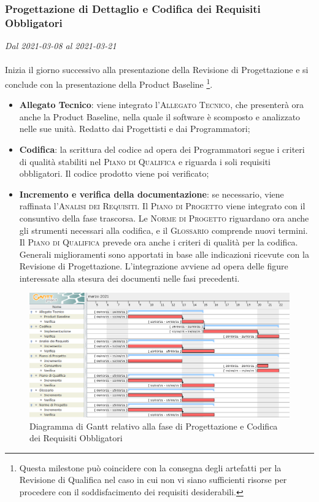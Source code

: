 \subsubsection{Progettazione di Dettaglio e Codifica dei Requisiti Obbligatori}

\textit{Dal 2021-03-08 al 2021-03-21}
\\\\
Inizia il giorno successivo alla presentazione della Revisione di Progettazione e si conclude con la presentazione della Product Baseline \footnote{Questa milestone può coincidere con la consegna degli artefatti per la Revisione di Qualifica nel caso in cui non vi siano sufficienti risorse per procedere con il soddisfacimento dei requisiti desiderabili.}.
\begin{itemize}
	\item \textbf{Allegato Tecnico}: viene integrato l'\textsc{Allegato Tecnico}, che presenterà ora anche la Product Baseline, nella quale il software è scomposto e analizzato nelle sue unità. Redatto dai Progettisti e dai Programmatori;
	\item \textbf{Codifica}: la scrittura del codice ad opera dei Programmatori segue i criteri di qualità stabiliti nel \textsc{Piano di Qualifica} e riguarda i soli requisiti obbligatori. Il codice prodotto viene poi verificato;
	\item \textbf{Incremento e verifica della documentazione}: se necessario, viene raffinata l'\textsc{Analisi dei Requisiti}. Il \textsc{Piano di Progetto} viene integrato con il consuntivo della fase trascorsa.  Le \textsc{Norme di Progetto} riguardano ora anche gli strumenti necessari alla codifica, e il \textsc{Glossario} comprende nuovi termini. Il \textsc{Piano di Qualifica} prevede ora anche i criteri di qualità per la codifica. Generali miglioramenti sono apportati in base alle indicazioni ricevute con la Revisione di Progettazione. L'integrazione avviene ad opera delle figure interessate alla stesura dei documenti nelle fasi precedenti.
	
\end{itemize}


\begin{figure}[H]
	\centering
	\includegraphics[scale=0.52]{res/images/04_gantt_codifica_obbligatori.png}
	\caption{Diagramma di Gantt relativo alla fase di Progettazione  e Codifica dei Requisiti Obbligatori}
\end{figure}



